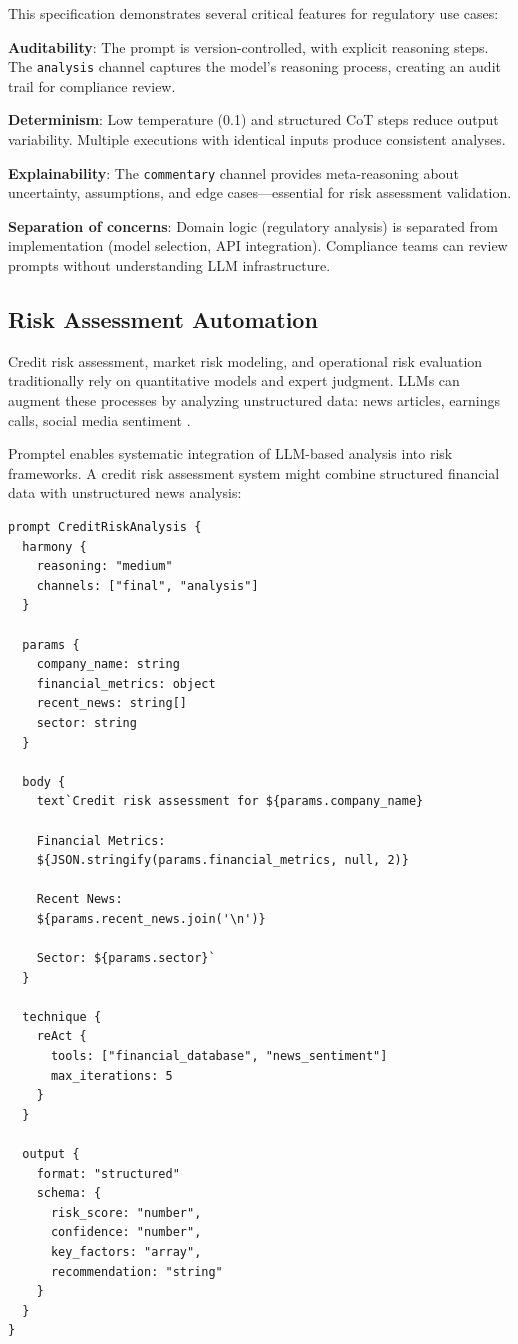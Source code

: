 \documentclass[11pt,a4paper]{article}
\begin{document}
This specification demonstrates several critical features for regulatory use cases:

\textbf{Auditability}: The prompt is version-controlled, with explicit reasoning steps. The \texttt{analysis} channel captures the model's reasoning process, creating an audit trail for compliance review.

\textbf{Determinism}: Low temperature (0.1) and structured CoT steps reduce output variability. Multiple executions with identical inputs produce consistent analyses.

\textbf{Explainability}: The \texttt{commentary} channel provides meta-reasoning about uncertainty, assumptions, and edge cases—essential for risk assessment validation.

\textbf{Separation of concerns}: Domain logic (regulatory analysis) is separated from implementation (model selection, API integration). Compliance teams can review prompts without understanding LLM infrastructure.

\subsection{Risk Assessment Automation}

Credit risk assessment, market risk modeling, and operational risk evaluation traditionally rely on quantitative models and expert judgment. LLMs can augment these processes by analyzing unstructured data: news articles, earnings calls, social media sentiment \cite{lopez2021sentiment}.

Promptel enables systematic integration of LLM-based analysis into risk frameworks. A credit risk assessment system might combine structured financial data with unstructured news analysis:

\begin{lstlisting}[caption=Credit risk assessment]
prompt CreditRiskAnalysis {
  harmony {
    reasoning: "medium"
    channels: ["final", "analysis"]
  }

  params {
    company_name: string
    financial_metrics: object
    recent_news: string[]
    sector: string
  }

  body {
    text`Credit risk assessment for ${params.company_name}

    Financial Metrics:
    ${JSON.stringify(params.financial_metrics, null, 2)}

    Recent News:
    ${params.recent_news.join('\n')}

    Sector: ${params.sector}`
  }

  technique {
    reAct {
      tools: ["financial_database", "news_sentiment"]
      max_iterations: 5
    }
  }

  output {
    format: "structured"
    schema: {
      risk_score: "number",
      confidence: "number",
      key_factors: "array",
      recommendation: "string"
    }
  }
}
\end{lstlisting}
\end{document}
